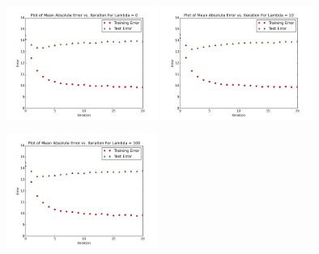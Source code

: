 \documentclass[12pt]{article}
\newcommand{\factwidth}{0.44}
\newcommand{\factheight}{1.6in}
\begin{document}
\begin{figure}[H]
\centering
\includegraphics[width=0\factwidth\textwidth,height=\factheight]{matrix_plots/test-i40d25l0.png}
\includegraphics[width=0\factwidth\textwidth,height=\factheight]{matrix_plots/test-i40d25l10.png}
\includegraphics[width=0\factwidth\textwidth,height=\factheight]{matrix_plots/test-i40d25l100.png}

\end{figure}
\end{document}
